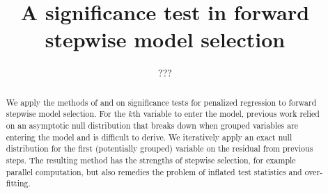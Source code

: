 \documentclass{imsart}
\begin{document}
\begin{frontmatter}

\title{A significance test in forward stepwise model selection}


\author{ 
\and {} 
\and ???}


\address{Department of Statistics\\  Stanford University\\ Sequoia
Hall \\390 Serra Mall\\ Stanford, CA 94305, U.S.A.\\ }


\begin{abstract}
  We apply the methods of \cite{tests:adaptive} and
  \cite{significance:lasso} on significance tests for penalized
  regression to forward stepwise model selection. For the $k$th
  variable to enter the model, previous work relied on an asymptotic
  null distribution that breaks down when grouped variables are
  entering the model and is difficult to derive. We iteratively apply
  an exact null distribution for the first (potentially grouped)
  variable on the residual from previous steps. The resulting method
  has the strengths of stepwise selection, for example parallel
  computation, but also remedies the problem of inflated test
  statistics and over-fitting.
\end{abstract}

\begin{keyword}[class=AMS]
\end{keyword}

\begin{keyword}
\end{keyword}

\end{frontmatter}
\end{document}
